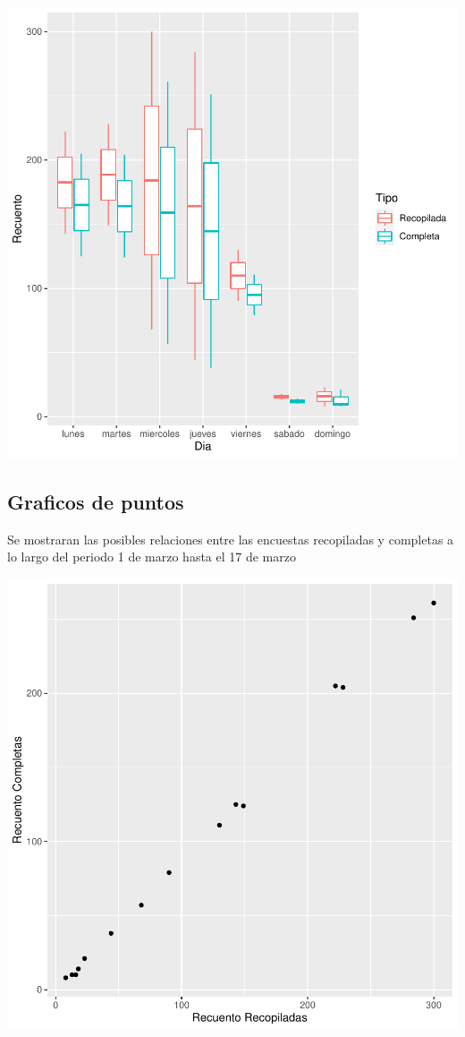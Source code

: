 \documentclass{article}
\begin{document}
\includegraphics{seguimento2-052}

\subsection{Graficos de puntos}
Se mostraran las posibles relaciones entre las encuestas recopiladas y completas a lo largo del periodo 1 de marzo hasta el 17 de marzo

\includegraphics{seguimento2-053}
\end{document}
